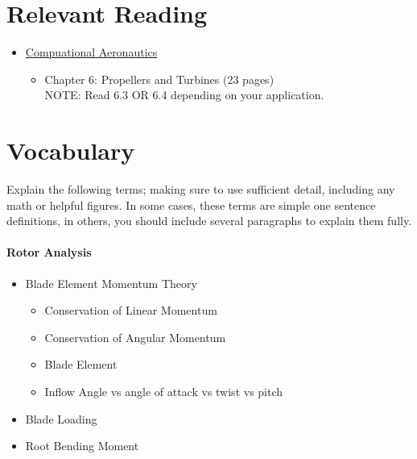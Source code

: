 \documentclass[11pt,twocolumn]{article}
\begin{document}
	
	
	
\section*{Relevant Reading}
\label{sec:reading}

\begin{itemize}
	\item \href{https://byu.box.com/shared/static/ywfayozbj3sr2ot6b32u8nqk5brqvurt.pdf}{Compuational Aeronautics}
	\begin{itemize}
		\item Chapter 6: Propellers and Turbines (23 pages) \\
		NOTE: Read 6.3 OR 6.4 depending on your application.
	\end{itemize}
\end{itemize}




\section{Vocabulary}
\label{sec:vocab}

Explain the following terms; making sure to use sufficient detail, including any math or helpful figures.
In some cases, these terms are simple one sentence definitions, in others, you should include several paragraphs to explain them fully.



\paragraph{Rotor Analysis}
\begin{itemize}
	\item Blade Element Momentum Theory
	\begin{itemize}
		\item Conservation of Linear Momentum
		\item Conservation of Angular Momentum
		\item Blade Element
		\item Inflow Angle vs angle of attack vs twist vs pitch
	\end{itemize}
	\item Blade Loading
	\item Root Bending Moment
\end{itemize}
\end{document}
